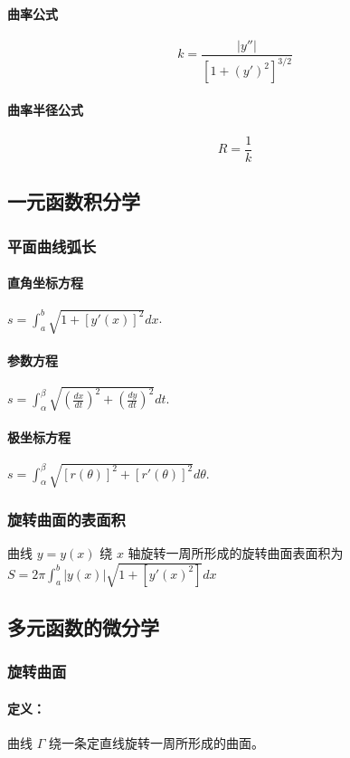 ﻿\documentclass[a4paper,12pt,UTF8]{ctexart}
\begin{document}
    \paragraph{曲率公式}
    \[k=\frac{|y''|}{[1+(y')^2]^{3/2}}\]
    \paragraph{曲率半径公式}
    \[R=\frac{1}{k}\]

    \subsection{一元函数积分学}

    \subsubsection{平面曲线弧长}

    \paragraph{直角坐标方程} \(s=\int_{a}^{b} \sqrt{1+[y'(x)]^2}dx \). 
    \paragraph{参数方程} \(s=\int_{\alpha}^{\beta} \sqrt{\left(\frac{dx}{dt}\right)^2+\left(\frac{dy}{dt}\right)^2}dt \).
    \paragraph{极坐标方程} \(s=\int_{\alpha}^{\beta} \sqrt{[r(\theta)]^2+[r'(\theta)]^2}d\theta \).

    \subsubsection{旋转曲面的表面积}
    曲线 \(y=y(x)\) 绕 \(x\) 轴旋转一周所形成的旋转曲面表面积为 \(S=2 \pi \int_{a}^{b} \left| y(x) \right| \sqrt{1+[y'(x)^2]}dx \) 

    \subsection{多元函数的微分学}

    \subsubsection{旋转曲面}
    \paragraph{定义：} 曲线 \(\varGamma\) 绕一条定直线旋转一周所形成的曲面。
    
\end{document}
